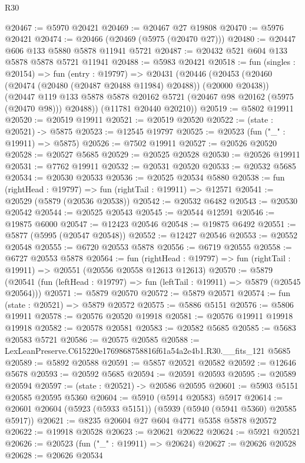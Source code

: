 \begin{lexlean}{R30}
\begin{coremodule}
@20467 := @5970 @20421
@20469 := @20467 @27 @19808
@20470 := @5976 @20421
@20474 := @20466 (@20469 (@5975 (@20470 @27)))
@20480 := @20447 @606 @133 @5880 @5878 @11941 @5721
@20487 := @20432 @521 @604 @133 @5878 @5878 @5721 @11941
@20488 := @5983 @20421
@20518 := fun (singles : @20154) =>
  fun (entry : @19797) =>
  @20431
    (@20446
      (@20453
        (@20460 (@20474 (@20480 (@20487 @20488 @11984) @20488)) (@20000 @20438))
        (@20447 @119 @133 @5878 @5878 @20162 @5721 (@20467 @98 @20162 (@5975 (@20470 @98))) @20488))
      (@11781 @20440 @20210))
@20519 := @5802 @19911
@20520 := @20519 @19911
@20521 := @20519 @20520
@20522 := (state : @20521) -> @5875
@20523 := @12545 @19797
@20525 := @20523 (fun ("_" : @19911) => @5875)
@20526 := @7502 @19911
@20527 := @20526 @20520
@20528 := @20527 @5685
@20529 := @20525 @20528
@20530 := @20526 @19911
@20531 := @7762 @19911
@20532 := @20531 @20520
@20533 := @20532 @5685
@20534 := @20530 @20533
@20536 := @20525 @20534 @5880
@20538 := fun (rightHead : @19797) => fun (rightTail : @19911) => @12571
@20541 := @20529 (@5879 (@20536 @20538))
@20542 := @20532 @6482
@20543 := @20530 @20542
@20544 := @20525 @20543
@20545 := @20544 @12591
@20546 := @19875 @6000
@20547 := @12423 @20546
@20548 := @19875 @6492
@20551 := @5877 (@5995 (@20547 @20548))
@20552 := @12427 @20546
@20553 := @20552 @20548
@20555 := @6720 @20553 @5878
@20556 := @6719 @20555
@20558 := @6727 @20553 @5878
@20564 := fun (rightHead : @19797) =>
  fun (rightTail : @19911) => @20551 (@20556 @20558 @12613 @12613)
@20570 := @5879
    (@20541 (fun (leftHead : @19797) => fun (leftTail : @19911) => @5879 (@20545 @20564)))
@20571 := @5879 @20570
@20572 := @5879 @20571
@20574 := fun (state : @20521) => @5879 @20572
@20575 := @5886 @5151
@20576 := @5806 @19911
@20578 := @20576 @20520 @19918
@20581 := @20576 @19911 @19918 @19918
@20582 := @20578 @20581
@20583 := @20582 @5685
@20585 := @5683 @20583 @5721
@20586 := @20575 @20585
@20588 := LexLeanPreserve.C615220e1769868758816f61a54a2e4b1.R30.__fits_121 @5685
@20589 := @5892 @20588
@20591 := @5857 @20521 @20582
@20592 := @12646 @5678
@20593 := @20592 @5685
@20594 := @20591 @20593
@20595 := @20589 @20594
@20597 := (state : @20521) -> @20586 @20595
@20601 := @5903 @5151 @20585 @20595 @5360
@20604 := @5910 (@5914 @20583) @5917
@20614 := @20601 @20604 (@5923 (@5933 @5151)) (@5939 (@5940 (@5941 @5360) @20585 @5917))
@20621 := @8235 @20604 @27 @604 @4771 @5358 @5878 @20572
@20622 := @19918 @20528
@20623 := @20621 @20622
@20624 := @5921 @20521
@20626 := @20523 (fun ("_" : @19911) => @20624)
@20627 := @20626 @20528
@20628 := @20626 @20534

\end{coremodule}
\end{lexlean}
